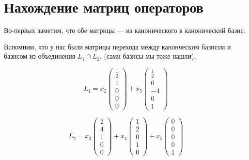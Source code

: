 \documentclass[12pt, a4paper]{article}
\begin{document}
    \section{Нахождение матриц операторов}

    Во-первых заметим, что обе матрицы — из канонического в канонический базис.

    Вспомним, что у нас были матрицы перехода между канонческим базисом и базисом из объединения $L_1 \cap L_2$.
    (сами базисы мы тоже нашли).

    \begin{equation}
        L_1 = x_2 \left(\begin{matrix}
            \frac{1}{2} \\
            1 \\
            0 \\
            0 \\
            0
        \end{matrix}\right) + x_5 \left(\begin{matrix}
            \frac{1}{2} \\
            0 \\
            -4 \\
            0 \\
            1
        \end{matrix}\right)
    \end{equation}

    \begin{equation}
        L_2 = x_3 \left(\begin{matrix}
            2 \\
            4 \\
            1 \\
            0 \\
            0
        \end{matrix}\right) + x_4 \left(\begin{matrix}
            1 \\
            2 \\
            0 \\
            1 \\
            0
            \end{matrix}\right) + x_5 \begin{pmatrix}
            0 \\ 0\\0\\0\\1
        \end{pmatrix}
    \end{equation}
\end{document}
